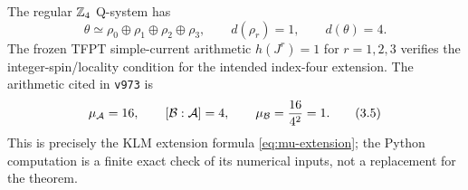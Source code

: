 The regular $\mathbb Z_4$ Q-system has
\[
 \theta\simeq\rho_0\oplus\rho_1\oplus\rho_2\oplus\rho_3,
\qquad d(\rho_r)=1,\qquad d(\theta)=4.
\tag{3.4}\label{eq:regular-q}
\]
The frozen TFPT simple-current arithmetic
$h(J^r)=1$ for $r=1,2,3$ verifies the integer-spin/locality condition
for the intended index-four extension.  The arithmetic cited in
\texttt{v973} is
\[
 \mu_{\mathcal A}=16,\qquad [\mathcal B:\mathcal A]=4,\qquad
 \mu_{\mathcal B}=\frac{16}{4^2}=1.
\tag{3.5}\label{eq:tfpt-mu}
\]
This is precisely the KLM extension formula
\eqref{eq:mu-extension}; the Python computation is a finite exact
check of its numerical inputs, not a replacement for the theorem.

